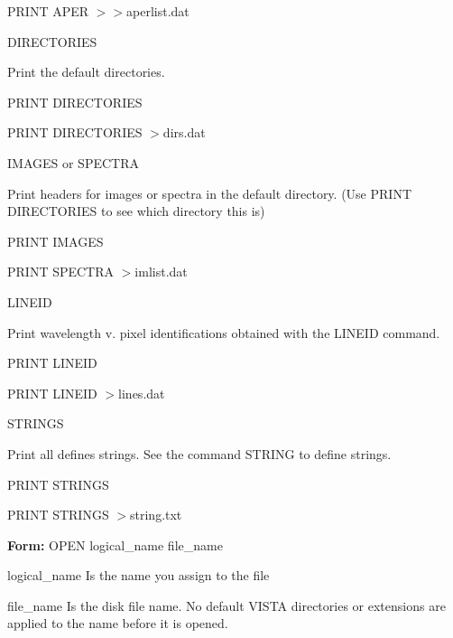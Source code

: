 {\begin{example}
{\begin{hanging}
    \item{PRINT APER $>>$aperlist.dat}
  \end{hanging}
}
\par
\item[DIRECTORIES\hfill]{Print the default directories.
  \begin{hanging}
    \item{PRINT DIRECTORIES}
    \item{PRINT DIRECTORIES $>$dirs.dat}
  \end{hanging}
}
\par
\item[IMAGES or SPECTRA\hfill]{Print headers for images or spectra in the
       default directory.  (Use PRINT DIRECTORIES to see which directory
       this is)
  \begin{hanging}
    \item{PRINT IMAGES}
    \item{PRINT SPECTRA $>$imlist.dat}
  \end{hanging}
}
\par
\item[LINEID\hfill]{Print wavelength v. pixel identifications obtained
       with the LINEID command.
  \begin{hanging}
    \item{PRINT LINEID}
    \item{PRINT LINEID $>$lines.dat}
  \end{hanging}
}
\par
\item[STRINGS\hfill]{Print all defines strings.  See the command STRING
       to define strings.
  \begin{hanging}
    \item{PRINT STRINGS}
    \item{PRINT STRINGS $>$string.txt}
  \end{hanging}
}
\end{example}%
\lthtmlfigureZ
\lthtmlcheckvsize\clearpage}

{\newpage\clearpage
{}%
\begin{command}
  \item[\textbf{Form: } OPEN logical\_name file\_name\hfill]{}
  \item[logical\_name]{Is the name you assign to the file}
  \item[file\_name]{Is the disk file name.  No default VISTA directories or
       extensions are applied to the name before it is opened.}
\end{command}%
\lthtmlfigureZ
\lthtmlcheckvsize\clearpage}

